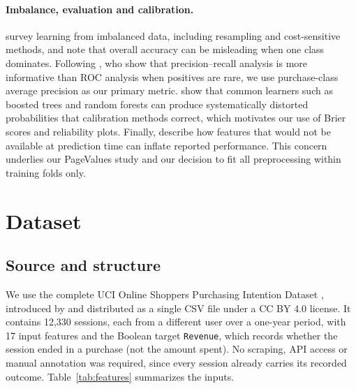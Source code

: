 \documentclass[11pt]{article}
\begin{document}
\paragraph{Imbalance, evaluation and calibration.}
\citet{he2009imbalanced} survey learning from imbalanced data, including
resampling and cost-sensitive methods, and note that overall accuracy can
be misleading when one class dominates. Following \citet{saito2015precision},
who show that precision--recall analysis is more informative than ROC
analysis when positives are rare, we use purchase-class average precision as
our primary metric. \citet{niculescu2005predicting} show that common learners
such as boosted trees and random forests can produce systematically distorted
probabilities that calibration methods correct, which motivates our use of
Brier scores and reliability plots. Finally, \citet{kaufman2012leakage}
describe how features that would not be available at prediction time can
inflate reported performance. This concern underlies our PageValues study
and our decision to fit all preprocessing within training folds only.

\section{Dataset}

\subsection{Source and structure}

We use the complete UCI Online Shoppers Purchasing Intention Dataset
\citep{sakar2018dataset}, introduced by \citet{sakar2019realtime} and
distributed as a single CSV file under a CC BY 4.0 license. It contains
12,330 sessions, each from a different user over a one-year period, with 17
input features and the Boolean target \texttt{Revenue}, which records whether
the session ended in a purchase (not the amount spent). No scraping, API
access or manual annotation was required, since every session already carries
its recorded outcome. Table~\ref{tab:features} summarizes the inputs.
\end{document}
